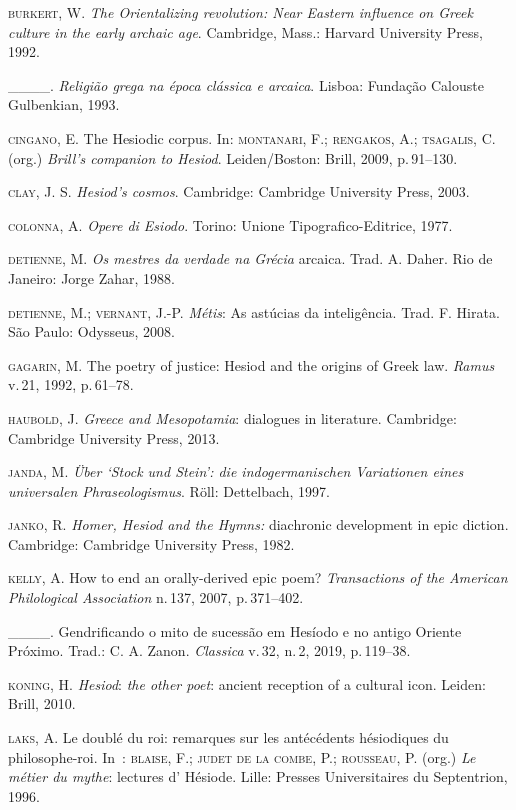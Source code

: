 \textsc{burkert}, W. \textit{The Orientalizing revolution: Near Eastern influence
on Greek culture in the early archaic age}. Cambridge, Mass.: Harvard
University Press, 1992.

\_\_\_\_. \textit{Religião grega na época clássica e arcaica}. Lisboa: Fundação
Calouste Gulbenkian, 1993.

\textsc{cingano}, E. The Hesiodic corpus. In: \textsc{montanari}, F.; \textsc{rengakos}, A.;
\textsc{tsagalis}, C. (org.) \textit{Brill's companion to Hesiod}. Leiden/Boston:
Brill, 2009, p.\,91--130.

\textsc{clay}, J. S. \textit{Hesiod's cosmos}. Cambridge: Cambridge University
Press, 2003.

\textsc{colonna}, A. \textit{Opere di Esiodo}. Torino: Unione Tipografico-Editrice,
1977.

\textsc{detienne}, M. \textit{Os mestres da verdade na Grécia} arcaica. Trad. A.
Daher. Rio de Janeiro: Jorge Zahar, 1988.

\textsc{detienne}, M.; \textsc{vernant}, J.-P. \textit{Métis}: As astúcias da inteligência.
Trad. F. Hirata. São Paulo: Odysseus, 2008.

\textsc{gagarin}, M. The poetry of justice: Hesiod and the origins of Greek law.
\textit{Ramus} v.\,21, 1992, p.\,61--78.

\textsc{haubold}, J. \textit{Greece and Mesopotamia}: dialogues in literature.
Cambridge: Cambridge University Press, 2013.

\textsc{janda}, M. \textit{Über `Stock und Stein': die indogermanischen Variationen
eines universalen Phraseologismus}. Röll: Dettelbach, 1997.

\textsc{janko}, R. \textit{Homer, Hesiod and the Hymns:} diachronic development in
epic diction. Cambridge: Cambridge University Press, 1982.

\textsc{kelly}, A. How to end an orally-derived epic poem? \textit{Transactions of
the American Philological Association} n.\,137, 2007, p.\,371--402.

\_\_\_\_. Gendrificando o mito de sucessão em Hesíodo e no antigo Oriente
Próximo. Trad.: C. A. Zanon. \textit{Classica} v.\,32, n.\,2, 2019, p.\,119--38.

\textsc{koning}, H. \textit{Hesiod}: \textit{the other poet}: ancient reception of a
cultural icon. Leiden: Brill, 2010.

\textsc{laks}, A. Le doublé du roi: remarques sur les antécédents hésiodiques du
philosophe-roi. In~: \textsc{blaise}, F.; \textsc{judet de la combe}, P.; \textsc{rousseau}, P.
(org.) \textit{Le métier du mythe}: lectures d' Hésiode. Lille: Presses
Universitaires du Septentrion, 1996.

